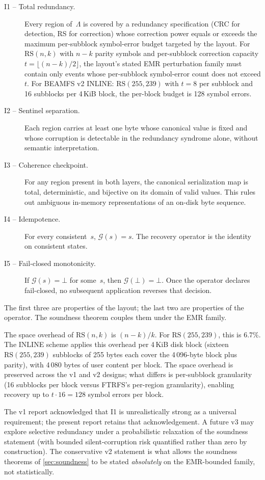 \begin{description}
\item[I1 -- Total redundancy.] Every region of~\(\Lambda\) is
  covered by a redundancy specification (CRC for detection, RS for
  correction) whose correction power equals or exceeds the maximum
  per-subblock symbol-error budget targeted by the layout. For
  \(\mathrm{RS}(n, k)\) with \(n - k\) parity symbols and
  per-subblock correction capacity \(t = \lfloor (n-k)/2 \rfloor\),
  the layout's stated EMR perturbation family must contain only
  events whose per-subblock symbol-error count does not exceed
  \(t\). For BEAMFS v2 INLINE: \(\mathrm{RS}(255, 239)\) with
  \(t = 8\) per subblock and 16 subblocks per 4\,KiB block, the
  per-block budget is 128 symbol errors.
\item[I2 -- Sentinel separation.] Each region carries at least one
  byte whose canonical value is fixed and whose corruption is
  detectable in the redundancy syndrome alone, without semantic
  interpretation.
\item[I3 -- Coherence checkpoint.] For any region present in both
  layers, the canonical serialization map is total, deterministic,
  and bijective on its domain of valid values. This rules out
  ambiguous in-memory representations of an on-disk byte sequence.
\item[I4 -- Idempotence.] For every consistent~\(s\),
  \(\mathcal{G}(s) = s\). The recovery operator is the identity on
  consistent states.
\item[I5 -- Fail-closed monotonicity.] If
  \(\mathcal{G}(s) = \bot\) for some~\(s\), then
  \(\mathcal{G}(\bot) = \bot\). Once the operator declares
  fail-closed, no subsequent application reverses that decision.
\end{description}

The first three are properties of the layout; the last two are
properties of the operator. The soundness theorem couples them
under the EMR family.

\begin{remark}
The space overhead of \(\mathrm{RS}(n, k)\) is \((n-k)/k\). For
\(\mathrm{RS}(255, 239)\), this is 6.7\%. The INLINE scheme
applies this overhead per 4\,KiB disk block (sixteen
\(\mathrm{RS}(255,239)\) subblocks of 255 bytes each cover the
4\,096-byte block plus parity), with 4\,080 bytes of user content
per block. The space overhead is preserved across the v1 and v2
designs; what differs is per-subblock granularity (16 subblocks
per block versus FTRFS's per-region granularity), enabling
recovery up to \(t \cdot 16 = 128\) symbol errors per block.
\end{remark}

\begin{remark}
The v1 report acknowledged that I1 is unrealistically strong as a
universal requirement; the present report retains that
acknowledgement. A future v3 may explore selective redundancy
under a probabilistic relaxation of the soundness statement (with
bounded silent-corruption risk quantified rather than zero by
construction). The conservative v2 statement is what allows the
soundness theorems of \cref{sec:soundness} to be stated
\emph{absolutely} on the EMR-bounded family, not statistically.
\end{remark}
